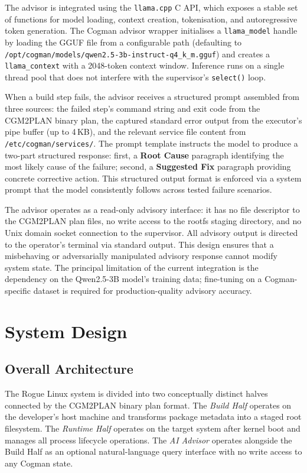 \documentclass[12pt,a4paper]{report}
\begin{document}
The advisor is integrated using the \texttt{llama.cpp} C API, which exposes a
stable set of functions for model loading, context creation, tokenisation, and
autoregressive token generation. The Cogman advisor wrapper initialises a
\texttt{llama\_model} handle by loading the GGUF file from a configurable path
(defaulting to \texttt{/opt/cogman/models/qwen2.5-3b-instruct-q4\_k\_m.gguf})
and creates a \texttt{llama\_context} with a 2048-token context window. Inference
runs on a single thread pool that does not interfere with the supervisor's
\texttt{select()} loop.

When a build step fails, the advisor receives a structured prompt assembled from
three sources: the failed step's command string and exit code from the CGM2PLAN
binary plan, the captured standard error output from the executor's pipe buffer
(up to 4\,KB), and the relevant service file content from
\texttt{/etc/cogman/services/}. The prompt template instructs the model to produce
a two-part structured response: first, a \textbf{Root Cause} paragraph identifying
the most likely cause of the failure; second, a \textbf{Suggested Fix} paragraph
providing concrete corrective action. This structured output format is enforced via
a system prompt that the model consistently follows across tested failure scenarios.

The advisor operates as a read-only advisory interface: it has no file descriptor
to the CGM2PLAN plan files, no write access to the rootfs staging directory, and
no Unix domain socket connection to the supervisor. All advisory output is directed
to the operator's terminal via standard output. This design ensures that a
misbehaving or adversarially manipulated advisory response cannot modify system
state. The principal limitation of the current integration is the dependency on the
Qwen2.5-3B model's training data; fine-tuning on a Cogman-specific dataset is
required for production-quality advisory accuracy.

\chapter{System Design}

\section{Overall Architecture}

The Rogue Linux system is divided into two conceptually distinct halves connected
by the CGM2PLAN binary plan format. The \textit{Build Half} operates on the
developer's host machine and transforms package metadata into a staged root
filesystem. The \textit{Runtime Half} operates on the target system after kernel
boot and manages all process lifecycle operations. The \textit{AI Advisor} operates
alongside the Build Half as an optional natural-language query interface with no
write access to any Cogman state.
\end{document}
